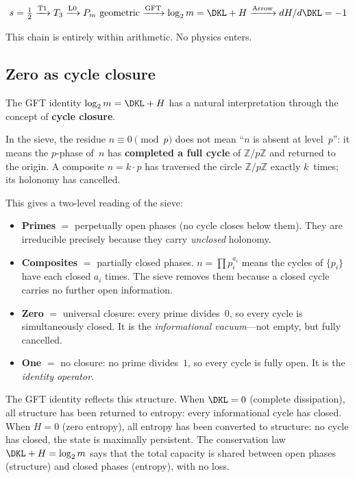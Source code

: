 \documentclass[12pt,a4paper]{article}
\begin{document}
\[
  s = \tfrac{1}{2}
  \xrightarrow{\text{T1}} T_3
  \xrightarrow{\text{L0}} P_m \text{ geometric}
  \xrightarrow{\text{GFT}} \log_2 m = \DKL + H \xrightarrow{\text{Arrow}} dH/d\DKL = -1
\]

This chain is entirely within arithmetic. No physics enters.

\subsection{Zero as cycle closure}
\label{sec:ch4_zero}

The GFT identity $\log_2 m = \DKL + H$ has a natural interpretation
through the concept of \textbf{cycle closure}.

\begin{remark}
\label{rem:zero_phase_gft}
In the sieve, the residue $n \equiv 0 \pmod{p}$ does not mean
``$n$ is absent at level~$p$'': it means the $p$-phase of~$n$
has \textbf{completed a full cycle} of $\mathbb{Z}/p\mathbb{Z}$
and returned to the origin.  A composite $n = k \cdot p$ has
traversed the circle $\mathbb{Z}/p\mathbb{Z}$ exactly $k$~times;
its holonomy has cancelled.

This gives a two-level reading of the sieve:
\begin{itemize}[nosep]
\item \textbf{Primes} $=$ perpetually open phases (no cycle closes
  below them).  They are irreducible precisely because they carry
  \emph{unclosed} holonomy.
\item \textbf{Composites} $=$ partially closed phases.
  $n = \prod p_i^{a_i}$ means the cycles of $\{p_i\}$ have each
  closed $a_i$ times.  The sieve removes them because a closed
  cycle carries no further open information.
\item \textbf{Zero} $=$ universal closure: every prime divides~$0$,
  so every cycle is simultaneously closed.  It is the
  \emph{informational vacuum}---not empty, but fully cancelled.
\item \textbf{One} $=$ no closure: no prime divides~$1$, so every
  cycle is fully open.  It is the \emph{identity operator}.
\end{itemize}

The GFT identity reflects this structure.  When $\DKL = 0$
(complete dissipation), all structure has been returned to
entropy: every informational cycle has closed.  When
$H = 0$ (zero entropy), all entropy has been converted to
structure: no cycle has closed, the state is maximally
persistent.  The conservation law $\DKL + H = \log_2 m$ says
that the total capacity is shared between open phases (structure)
and closed phases (entropy), with no loss.
\end{remark}
\end{document}
